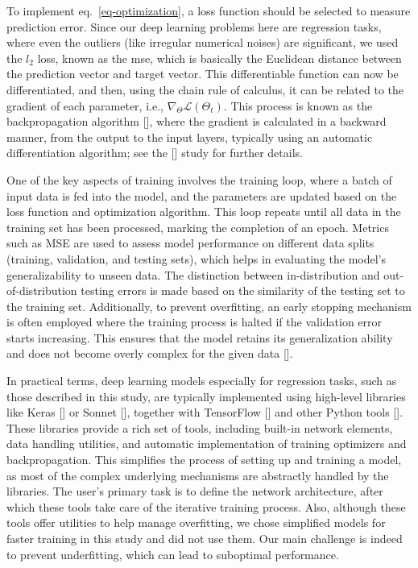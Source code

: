 To implement eq.~\ref{eq-optimization}, a loss function should be selected to measure prediction error. Since our deep learning problems here are regression tasks, where even the outliers (like irregular numerical noises) are significant, we used the \(l_2\) loss, known as the \ac{mse}, which is basically the Euclidean distance between the prediction vector and target vector. This differentiable function can now be differentiated, and then, using the chain rule of calculus, it can be related to the gradient of each parameter, i.e., \(\nabla_{\Theta} \mathcal{L}(\Theta_t)\). This process is known as the backpropagation algorithm [\cite{rumelhart1986}], where the gradient is calculated in a backward manner, from the output to the input layers, typically using an automatic differentiation algorithm; see the [\cite{baydin2018}] study for further details.

One of the key aspects of training involves the training loop, where a batch of input data is fed into the model, and the parameters are updated based on the loss function and optimization algorithm. This loop repeats until all data in the training set has been processed, marking the completion of an epoch. Metrics such as MSE are used to assess model performance on different data splits (training, validation, and testing sets), which helps in evaluating the model's generalizability to unseen data. The distinction between in-distribution and out-of-distribution testing errors is made based on the similarity of the testing set to the training set. Additionally, to prevent overfitting, an early stopping mechanism is often employed where the training process is halted if the validation error starts increasing. This ensures that the model retains its generalization ability and does not become overly complex for the given data [\cite{mlbook}].

In practical terms, deep learning models especially for regression tasks, such as those described in this study, are typically implemented using high-level libraries like Keras [\cite{chollet2015}] or Sonnet [\cite{reynolds2017}], together with TensorFlow [\cite{abadi2015}] and other Python tools [\cite{hunter2007,pedregosa2011,kluyver2016,harris2020,virtanen2020}]. These libraries provide a rich set of tools, including built-in network elements, data handling utilities, and automatic implementation of training optimizers and backpropagation. This simplifies the process of setting up and training a model, as most of the complex underlying mechanisms are abstractly handled by the libraries. The user's primary task is to define the network architecture, after which these tools take care of the iterative training process. Also, although these tools offer utilities to help manage overfitting, we chose simplified models for faster training in this study and did not use them. Our main challenge is indeed to prevent underfitting, which can lead to suboptimal performance.

